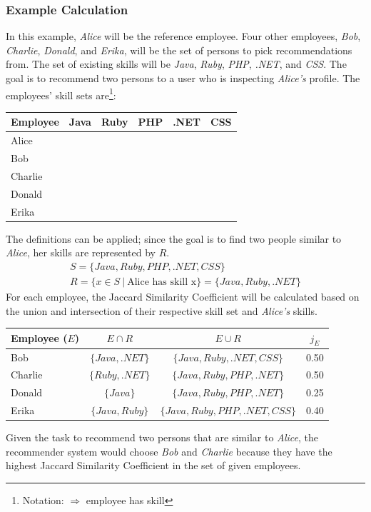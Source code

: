 \subsubsection{Example Calculation}
In this example, \textit{Alice} will be the reference employee. Four other employees, \textit{Bob}, \textit{Charlie}, \textit{Donald}, and \textit{Erika}, will be the set of persons to pick recommendations from. The set of existing skills will be \textit{Java}, \textit{Ruby}, \textit{PHP}, \textit{.NET}, and \textit{CSS}.
The goal is to recommend two persons to a user who is inspecting \textit{Alice's} profile.
The employees' skill sets are\footnote{Notation: \checkmark $\Rightarrow$ employee has skill}:
\begin{center}
\begin{tabular}{l||c|c|c|c|c}
	Employee & Java & Ruby & PHP & .NET & CSS \\
	\hline
	Alice    & \checkmark & \checkmark &            & \checkmark &            \\
	Bob      & \checkmark &            &            & \checkmark & \checkmark \\
	Charlie  &            & \checkmark & \checkmark & \checkmark &            \\
	Donald   & \checkmark &            & \checkmark &            &            \\
	Erika    & \checkmark & \checkmark & \checkmark &            & \checkmark \\
\end{tabular}
\end{center}
The definitions can be applied; since the goal is to find two people similar to \textit{Alice}, her skills are represented by $R$.
\begin{gather*}
	S = \{Java, Ruby, PHP, .NET, CSS\} \\
	R = \{x \in S \ | \ \textrm{Alice has skill x}\} = \{ Java, Ruby, .NET \}
\end{gather*}
For each employee, the Jaccard Similarity Coefficient will be calculated based on the union and intersection of their respective skill set and \textit{Alice's} skills.
\begin{center}
\begin{tabular}{l||c|c||c}
	Employee ($E$) & $E \cap R$ & $E \cup R$ & $j_E$ \\
	\hline
	Bob            & $\{Java, .NET\}$ & $\{Java, Ruby, .NET, CSS\}$ & 0.50 \\
	Charlie        & $\{Ruby, .NET\}$ & $\{Java, Ruby, PHP, .NET\}$ & 0.50 \\
	Donald         & $\{Java\}$ & $\{Java, Ruby, PHP, .NET\}$ & 0.25\\
	Erika          & $\{Java, Ruby\}$ & $\{Java, Ruby, PHP, .NET, CSS\}$ & 0.40\\
\end{tabular}
\end{center}
Given the task to recommend two persons that are similar to \textit{Alice}, the recommender system would choose \textit{Bob} and \textit{Charlie} because they have the highest Jaccard Similarity Coefficient in the set of given employees.



